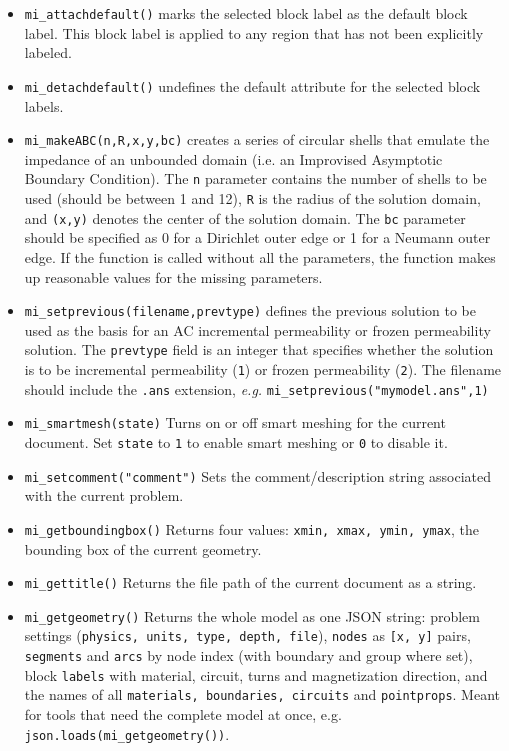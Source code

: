 \begin{itemize}
\item{\tt mi\_attachdefault()} marks the
selected block label as the default block label.  This block label
is applied to any region that has not been explicitly labeled.

\item{\tt mi\_detachdefault()} undefines the default
attribute for the selected block labels.

\item{\tt mi\_makeABC(n,R,x,y,bc)} creates a series of circular shells that emulate the
impedance of an unbounded domain (i.e. an Improvised Asymptotic Boundary
Condition).  The {\tt n} parameter contains the number of shells to be used
(should be between 1 and 12), {\tt R} is the radius of the solution domain, and
{\tt (x,y)} denotes the center of the solution domain.  The {\tt bc} parameter should
be specified as 0 for a Dirichlet outer edge or 1 for a Neumann outer edge.
If the function is called without all the parameters, the function makes up
reasonable values for the missing parameters. 

\item{\tt mi\_setprevious(filename,prevtype)} defines the previous solution to be used as the basis for an AC incremental
permeability or frozen permeability solution.  The {\tt prevtype} field is an integer that specifies whether the solution
is to be incremental permeability ({\tt 1}) or frozen permeability ({\tt 2}). The filename should include the {\tt .ans}
extension, {\em e.g.} {\tt mi\_setprevious("mymodel.ans",1)}

\item{\tt mi\_smartmesh(state)} Turns on or off smart meshing for the current document.  Set {\tt state} to {\tt 1} to enable smart meshing or {\tt 0} to disable it.

\item{\tt mi\_setcomment("comment")} Sets the comment/description string associated with the current problem.

\item{\tt mi\_getboundingbox()} Returns four values: {\tt xmin, xmax, ymin, ymax}, the bounding box of the current geometry.

\item{\tt mi\_gettitle()} Returns the file path of the current document as a string.

\item{\tt mi\_getgeometry()} Returns the whole model as one JSON string: problem settings ({\tt physics, units, type, depth, file}), {\tt nodes} as {\tt [x, y]} pairs, {\tt segments} and {\tt arcs} by node index (with boundary and group where set), block {\tt labels} with material, circuit, turns and magnetization direction, and the names of all {\tt materials, boundaries, circuits} and {\tt pointprops}. Meant for tools that need the complete model at once, e.g. {\tt json.loads(mi\_getgeometry())}.

\end{itemize}

